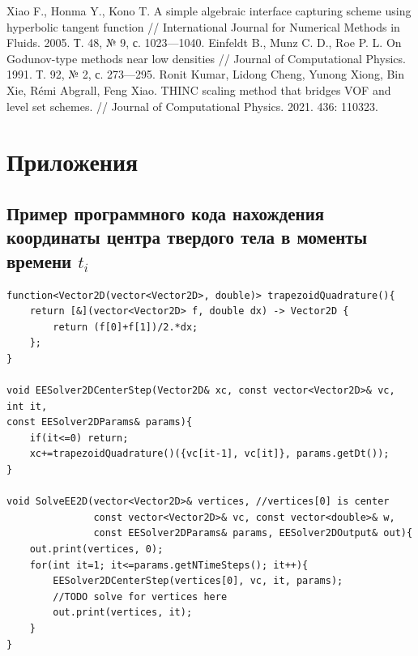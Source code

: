 \documentclass[12pt,a4paper]{article}
\begin{document}
\begin{thebibliography}{3}
Xiao F., Honma Y., Kono T. A simple algebraic interface capturing scheme using hyperbolic tangent function // International Journal for Numerical Methods in Fluids. 2005. Т. 48, № 9, с. 1023—1040.
Einfeldt B., Munz C. D., Roe P. L. On Godunov-type methods near low densities // Journal of Computational Physics. 1991. Т. 92, № 2, с. 273—295.
Ronit Kumar, Lidong Cheng, Yunong Xiong, Bin Xie, Rémi Abgrall, Feng Xiao. THINC scaling method that bridges VOF and level set schemes. // Journal of Computational Physics. 2021. 436: 110323.
\end{thebibliography}

\newpage
\section{Приложения}
\subsection{Пример программного кода нахождения координаты центра твердого тела в моменты времени $t_i$}
\label{code:xc}
\begin{lstlisting}
function<Vector2D(vector<Vector2D>, double)> trapezoidQuadrature(){
    return [&](vector<Vector2D> f, double dx) -> Vector2D {
        return (f[0]+f[1])/2.*dx;
    };
}

void EESolver2DCenterStep(Vector2D& xc, const vector<Vector2D>& vc, int it,
const EESolver2DParams& params){
    if(it<=0) return;
    xc+=trapezoidQuadrature()({vc[it-1], vc[it]}, params.getDt());
}

void SolveEE2D(vector<Vector2D>& vertices, //vertices[0] is center
               const vector<Vector2D>& vc, const vector<double>& w,
               const EESolver2DParams& params, EESolver2DOutput& out){
    out.print(vertices, 0);
    for(int it=1; it<=params.getNTimeSteps(); it++){
        EESolver2DCenterStep(vertices[0], vc, it, params);
        //TODO solve for vertices here
        out.print(vertices, it);
    }
}
\end{lstlisting}
\end{document}
